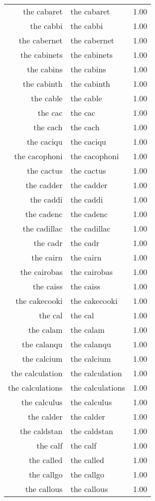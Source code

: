 \begin{table}[ht]
\begin{tabular}{rlr}
  the cabaret & the cabaret & 1.00 \\ 
  the cabbi & the cabbi & 1.00 \\ 
  the cabernet & the cabernet & 1.00 \\ 
  the cabinets & the cabinets & 1.00 \\ 
  the cabins & the cabins & 1.00 \\ 
  the cabinth & the cabinth & 1.00 \\ 
  the cable & the cable & 1.00 \\ 
  the cac & the cac & 1.00 \\ 
  the cach & the cach & 1.00 \\ 
  the caciqu & the caciqu & 1.00 \\ 
  the cacophoni & the cacophoni & 1.00 \\ 
  the cactus & the cactus & 1.00 \\ 
  the cadder & the cadder & 1.00 \\ 
  the caddi & the caddi & 1.00 \\ 
  the cadenc & the cadenc & 1.00 \\ 
  the cadillac & the cadillac & 1.00 \\ 
  the cadr & the cadr & 1.00 \\ 
  the cairn & the cairn & 1.00 \\ 
  the cairobas & the cairobas & 1.00 \\ 
  the caiss & the caiss & 1.00 \\ 
  the cakecooki & the cakecooki & 1.00 \\ 
  the cal & the cal & 1.00 \\ 
  the calam & the calam & 1.00 \\ 
  the calanqu & the calanqu & 1.00 \\ 
  the calcium & the calcium & 1.00 \\ 
  the calculation & the calculation & 1.00 \\ 
  the calculations & the calculations & 1.00 \\ 
  the calculus & the calculus & 1.00 \\ 
  the calder & the calder & 1.00 \\ 
  the caldstan & the caldstan & 1.00 \\ 
  the calf & the calf & 1.00 \\ 
  the called & the called & 1.00 \\ 
  the callgo & the callgo & 1.00 \\ 
  the callous & the callous & 1.00 \\ 

\end{tabular}
\end{table}
